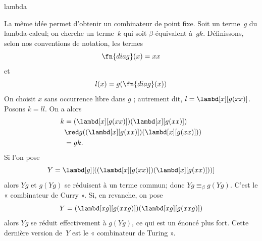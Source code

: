\documentclass[../../../include/open-logic-section]{subfiles}
\begin{document}
\begin{tagblock}{lambda}
\begin{digress}
La même idée permet d'obtenir un combinateur
de point fixe. Soit un terme~$g$ du lambda-calcul;
on cherche un terme~$k$ qui soit $\beta$-équivalent
à~$gk$. Définissons, selon nos conventions de
notation, les termes
\[
\fn{diag}(x) = xx
\]
et
\[
l(x) = g(\fn{diag}(x))
\]
On choisit $x$ sans occurrence libre dans $g$ ; autrement dit, $l=\lambd[x][g(xx)]$. Posons
$k=ll$. On a alors
\begin{align*}
k & = (\lambd[x][g(xx)])(\lambd[x][g(xx)]) \\
& \red  g((\lambd[x][g(xx)])(\lambd[x][g(xx)])) \\
& = gk.
\end{align*}
Si l'on pose
\[
Y = \lambd[g][((\lambd[x][g(xx)])(\lambd[x][g(xx)]))]
\]
alors $Yg$ et $g(Yg)$ se réduisent à un terme
commun; donc $Yg\equiv_\beta g(Yg)$. C'est le
« combinateur de Curry ». Si, en revanche,
on pose
\[
Y = (\lambd[xg][g(xxg)])(\lambd[xg][g(xxg)])
\]
alors $Yg$ se réduit effectivement à $g(Yg)$,
ce qui est un énoncé plus fort. Cette dernière
version de~$Y$ est le « combinateur de Turing ».
\end{digress}
\end{tagblock}
\end{document}
